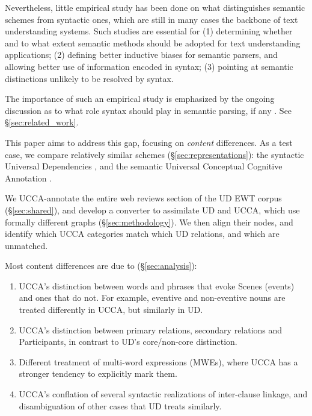 \documentclass[11pt,a4paper,table]{article}
\begin{document}
  Nevertheless, little empirical study has been done on what distinguishes semantic schemes from
  syntactic ones, which are still in many cases the backbone of text understanding systems. 
  Such studies are essential for 
  (1) determining whether and to what extent semantic methods should be adopted for text understanding applications;
  (2) defining better inductive biases for semantic parsers, and allowing better use of information encoded in syntax;
  (3) pointing at semantic distinctions unlikely to be resolved by syntax.

  The importance of such an empirical study is emphasized by the ongoing discussion as to what role syntax should
  play in semantic parsing, if any \cite{swayamdipta2018syntactic,strubell2018linguistically,P18-1192,C18-1233}.
  See \S\ref{sec:related_work}.

  This paper aims to address this gap,
  focusing on {\it content} differences.
  As a test case, we compare relatively similar schemes (\S\ref{sec:representations}):
  the syntactic Universal Dependencies \cite[UD; ][]{nivre2016universal},
  and the semantic Universal Conceptual Cognitive Annotation \cite[UCCA; ][]{abend2013universal}.
  
  We UCCA-annotate
  the entire web reviews section of the UD EWT corpus
  (\S\ref{sec:shared}),
  and develop a converter to assimilate UD and UCCA,
  which use formally different graphs
  (\S\ref{sec:methodology}).
  We then align their nodes, and identify which UCCA categories match which UD relations,
  and which are unmatched.

  Most content differences are due to (\S\ref{sec:analysis}):
  \begin{enumerate}[itemsep=0.159mm,leftmargin=5.95mm]
      \item UCCA's distinction between words and phrases that evoke Scenes (events) and ones that do not.
        For example, eventive and non-eventive nouns are treated differently in UCCA, but similarly in UD.
      \item UCCA's distinction between primary relations, secondary relations
        and Participants, in contrast to UD's core/non-core distinction.
      \item Different treatment of multi-word expressions (MWEs),
        where UCCA has a stronger tendency to explicitly mark them.
      \item UCCA's conflation of several syntactic realizations of inter-clause linkage,
        and disambiguation of other cases that UD treats similarly.
   \end{enumerate}
\end{document}
